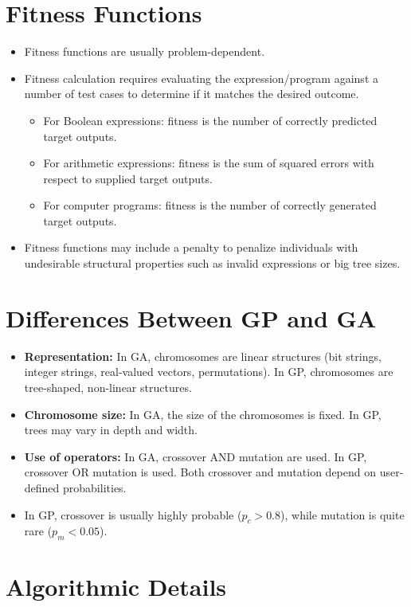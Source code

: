 \section{Fitness Functions}
\begin{itemize}
    \item  Fitness functions are usually problem-dependent.
   \item  Fitness calculation requires evaluating the expression/program against a number of test cases to determine if it matches the desired outcome.
    \begin{itemize}
        \item For Boolean expressions: fitness is the number of correctly predicted target outputs.
        \item For arithmetic expressions: fitness is the sum of squared errors with respect to supplied target outputs.
        \item For computer programs: fitness is the number of correctly generated target outputs.
    \end{itemize}
    \item Fitness functions may include a penalty to penalize individuals with undesirable structural properties such as invalid expressions or big tree sizes.
\end{itemize}

\section{Differences Between GP and GA}
\begin{itemize}
    \item \textbf{Representation:} In GA, chromosomes are linear structures (bit strings, integer strings, real-valued vectors, permutations). In GP, chromosomes are tree-shaped, non-linear structures.
     \item \textbf{Chromosome size:} In GA, the size of the chromosomes is fixed. In GP, trees may vary in depth and width.
     \item \textbf{Use of operators:} In GA, crossover AND mutation are used. In GP, crossover OR mutation is used. Both crossover and mutation depend on user-defined probabilities.
    \item In GP, crossover is usually highly probable ($p_c > 0.8$), while mutation is quite rare ($p_m < 0.05$).
\end{itemize}

\section{Algorithmic Details}

